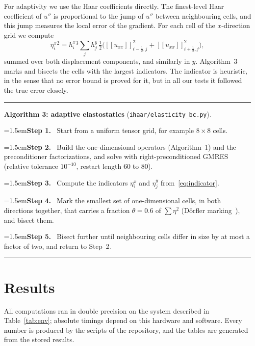 \documentclass[smallextended,envcountsame]{svjour3}
\newcommand{\step}[1]{\par\noindent\hangindent=1.5em\hangafter=1\textbf{Step #1.}\ }
\begin{document}
For adaptivity we use the Haar coefficients directly. The finest-level Haar coefficient of $u''$ is
proportional to the jump of $u''$ between neighbouring cells, and this jump measures the local error of
the gradient. For each cell of the $x$-direction grid we compute
\begin{equation}\label{eq:indicator}
\eta^x_i{}^2=h^x_i{}^3\sum_jh^y_j\,\tfrac12\Big([\![u_{xx}]\!]_{i-\frac12,j}^2+[\![u_{xx}]\!]_{i+\frac12,j}^2\Big),
\end{equation}
summed over both displacement components, and similarly in $y$. Algorithm~3 marks and bisects the cells
with the largest indicators. The indicator is heuristic, in the sense that no error bound is proved for it,
but in all our tests it followed the true error closely.

\begin{algorithm}[t]\small\hrule\smallskip
\noindent\textbf{Algorithm 3: adaptive elastostatics} (\texttt{ihaar/elasticity\_bc.py}).
\step{1} Start from a uniform tensor grid, for example $8\times8$ cells.
\step{2} Build the one-dimensional operators (Algorithm~1) and the preconditioner factorizations, and solve with right-preconditioned GMRES (relative tolerance $10^{-10}$, restart length 60 to 80).
\step{3} Compute the indicators $\eta^x_i$ and $\eta^y_j$ from~\eqref{eq:indicator}.
\step{4} Mark the smallest set of one-dimensional cells, in both directions together, that carries a fraction $\theta=0.6$ of $\sum\eta^2$ (D\"orfler marking~\cite{dorfler1996convergent}), and bisect them.
\step{5} Bisect further until neighbouring cells differ in size by at most a factor of two, and return to Step~2.
\smallskip\hrule
\end{algorithm}

\section{Results}\label{sec:results}
All computations ran in double precision on the system described in Table~\ref{tab:env}; absolute
timings depend on this hardware and software. Every number is produced by the scripts of the repository,
and the tables are generated from the stored results.

\begin{table}[t]\centering\footnotesize
\caption{Computing environment and timing protocol.}\label{tab:env}

\end{table}
\end{document}
